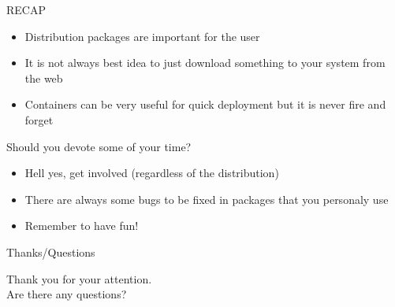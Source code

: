 \documentclass{beamer}
\begin{document}
\begin{frame}[t]{RECAP}
	\begin{itemize}
	\item Distribution packages are important for the user
	\item It is not always best idea to just download something to your system from the web
	\item Containers can be very useful for quick deployment but it is never fire and forget
	\end{itemize}
\end{frame}

\begin{frame}[t]{Should you devote some of your time?}
	\begin{itemize}
	\item Hell yes, get involved (regardless of the distribution)
    \item There are always some bugs to be fixed in packages that you personaly use
    \item Remember to have fun!
	\end{itemize}
\end{frame}

\begin{frame}{Thanks/Questions}
	\begin{center}
	Thank you for your attention.\\
	Are there any questions?
	\end{center}
\end{frame}
\end{document}
